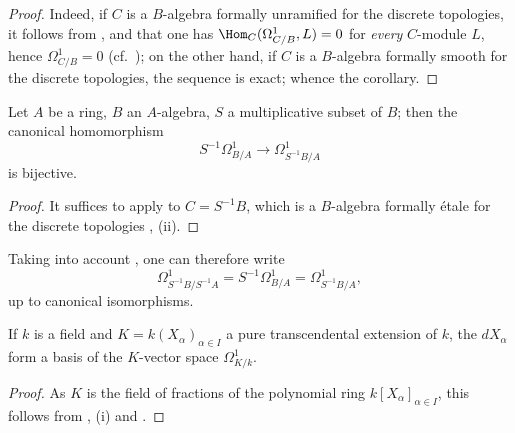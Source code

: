 \begin{proof}
Indeed, if $C$ is a $B$-algebra formally unramified for the discrete topologies, it follows from ,  and  that one has $\Hom_C(\Omega^1_{C/B},L)=0$ for \emph{every} $C$-module $L$, hence $\Omega^1_{C/B}=0$ (cf.\ ); on the other hand, if $C$ is a $B$-algebra formally smooth for the discrete topologies, the sequence  is exact; whence the corollary.
\end{proof}

\begin{corollary}[20.5.9]
\label{0.20.5.9}
Let $A$ be a ring, $B$ an $A$-algebra, $S$ a multiplicative subset of $B$; then the canonical homomorphism
\begin{equation}
\tag{20.5.9.1}
  \label{0.20.5.9.1}
  S^{-1}\Omega^1_{B/A}\to\Omega^1_{S^{-1}B/A}
\end{equation}
is bijective.
\end{corollary}

\begin{proof}
It suffices to apply  to $C=S^{-1}B$, which is a $B$-algebra formally \'{e}tale for the discrete topologies , (ii).
\end{proof}

Taking into account , one can therefore write
\begin{equation}
\tag{20.5.9.2}
  \label{0.20.5.9.2}
  \Omega^1_{S^{-1}B/S^{-1}A} = S^{-1}\Omega^1_{B/A} = \Omega^1_{S^{-1}B/A},
\end{equation}
up to canonical isomorphisms.

\begin{corollary}[20.5.10]
\label{0.20.5.10}
If $k$ is a field and $K=k(X_\alpha)_{\alpha\in I}$ a pure transcendental extension of $k$, the $dX_\alpha$ form a basis of the $K$-vector space $\Omega^1_{K/k}$.
\end{corollary}

\begin{proof}
As $K$ is the field of fractions of the polynomial ring $k[X_\alpha]_{\alpha\in I}$, this follows from , (i) and .
\end{proof}

